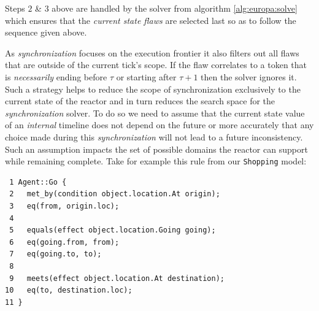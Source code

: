 

Steps $2$ \& $3$ above are handled by the \eu solver from algorithm
\ref{alg:europa:solve} which ensures that the {\em current state
  flaws} are selected last so as to follow the sequence given
above. 

As {\em synchronization} focuses on the execution frontier it also
filters out all flaws that are outside of the current tick's scope.
If the flaw correlates to a token that is {\em necessarily} ending
before $\tau$ or starting after $\tau+1$ then the solver ignores
it. Such a strategy helps to reduce the scope of synchronization
exclusively to the current state of the reactor and in turn reduces
the search space for the {\em synchronization} solver.  To do so we
need to assume that the current state value of an {\em internal}
timeline does not depend on the future or more accurately that any
choice made during this {\em synchronization} will not lead to a
future inconsistency.  Such an assumption impacts the set of possible
domains the reactor can support while remaining complete. Take for
example this rule from our \texttt{Shopping} model:

\begin{verbatim}
 1 Agent::Go {
 2   met_by(condition object.location.At origin);
 3   eq(from, origin.loc);
 4
 5   equals(effect object.location.Going going);
 6   eq(going.from, from);
 7   eq(going.to, to);
 8   
 9   meets(effect object.location.At destination);
10   eq(to, destination.loc);
11 }
\end{verbatim}

